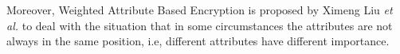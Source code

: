 Moreover, Weighted Attribute Based Encryption is proposed by Ximeng Liu \emph{et al.} \cite{Ximeng:ICC'14} to deal with the situation that in some circumstances the attributes are not always in the same position, i.e,
different attributes have different importance.

